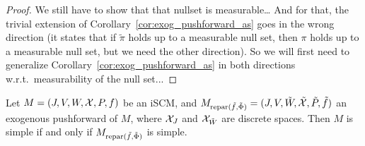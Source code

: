 {\begin{proof}
  We still have to show that that nullset is measurable\dots
  And for that, the trivial extension of Corollary~\ref{cor:exog_pushforward_as} goes in the wrong direction (it states that if $\tilde \pi$ holds up to a measurable null set, then $\pi$ holds up to a measurable null set, but we need the other direction).
  So we will first need to generalize Corollary~\ref{cor:exog_pushforward_as} in both directions w.r.t.\ measurability of the null set...
\end{proof}
}

\begin{Prp}\label{prp:exogenous_pushforward_discrete}
  Let $M = \left ( J, V, W, \mathcal{X}, P, f \right )$ be an iSCM, and $M_{\mathrm{repar}({\tilde{f}},{\tilde{\Phi}})} = ( J, V, \tilde{W}, \tilde{\mathcal{X}}, \tilde{P}, \tilde{f} )$ an exogenous pushforward of $M$,
  where $\mathcal{X}_J$ and $\mathcal{X}_{\tilde W}$ are discrete spaces.
  Then $M$ is simple if and only if $M_{\mathrm{repar}({\tilde{f}},{\tilde{\Phi}})}$ is simple.
\end{Prp}
